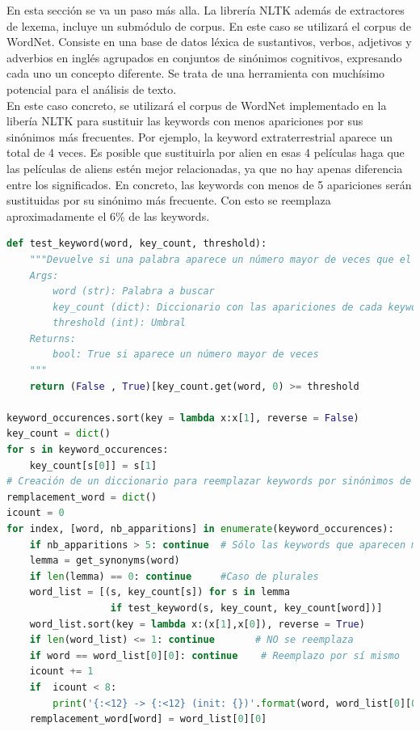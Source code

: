 En esta sección se va un paso más alla. La librería NLTK además de extractores de lexema, incluye un submódulo de corpus. En este caso se utilizará el corpus de WordNet. Consiste en una base de datos léxica de sustantivos, verbos, adjetivos y adverbios en inglés agrupados en conjuntos de sinónimos cognitivos, expresando cada uno un concepto diferente. Se trata de una herramienta con muchísimo potencial para el análisis de texto.\\

En este caso concreto, se utilizará el corpus de WordNet \cite{WordNet} implementado en la libería NLTK para sustituir las keywords con menos apariciones por sus sinónimos más frecuentes. Por ejemplo, la keyword extraterrestrial aparece un total de 4 veces. Es posible que sustituirla por alien en esas 4 películas haga que las películas de aliens estén mejor relacionadas, ya que no hay apenas diferencia entre los significados. En concreto, las keywords con menos de 5 apariciones serán sustituidas por su sinónimo más frecuente. Con esto se reemplaza aproximadamente el $6 \%$ de las keywords.
\begin{lstlisting}[language=Python, caption= Sustitución de las palabras menos frecuentes por sus sinónimos.]
def test_keyword(word, key_count, threshold):
    """Devuelve si una palabra aparece un número mayor de veces que el umbral señalado
    Args:
        word (str): Palabra a buscar
        key_count (dict): Diccionario con las apariciones de cada keyword
        threshold (int): Umbral
    Returns:
        bool: True si aparece un número mayor de veces
    """
    return (False , True)[key_count.get(word, 0) >= threshold
    
keyword_occurences.sort(key = lambda x:x[1], reverse = False)
key_count = dict()
for s in keyword_occurences:
    key_count[s[0]] = s[1]
# Creación de un diccionario para reemplazar keywords por sinónimos de mayor frecuencia
remplacement_word = dict()
icount = 0
for index, [word, nb_apparitions] in enumerate(keyword_occurences):
    if nb_apparitions > 5: continue  # Sólo las keywords que aparecen menos de 5 veces
    lemma = get_synonyms(word)
    if len(lemma) == 0: continue     #Caso de plurales
    word_list = [(s, key_count[s]) for s in lemma 
                  if test_keyword(s, key_count, key_count[word])]
    word_list.sort(key = lambda x:(x[1],x[0]), reverse = True)    
    if len(word_list) <= 1: continue       # NO se reemplaza
    if word == word_list[0][0]: continue    # Reemplazo por sí mismo
    icount += 1
    if  icount < 8:
        print('{:<12} -> {:<12} (init: {})'.format(word, word_list[0][0], word_list))    
    remplacement_word[word] = word_list[0][0]
\end{lstlisting}

